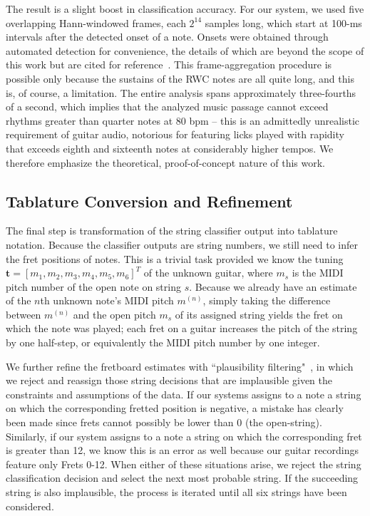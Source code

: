 \documentclass[12pt]{cmuthesis}
\begin{document}
The result is a slight boost in classification accuracy. For our system, we used five overlapping Hann-windowed frames, each $2^{14}$ samples long, which start at 100-ms intervals after the detected onset of a note. Onsets were obtained through automated detection for convenience, the details of which are beyond the scope of this work but are cited for reference~\cite{bello2005,dixon2006}. This frame-aggregation procedure is possible only because the sustains of the RWC notes are all quite long, and this is, of course, a limitation. The entire analysis spans approximately three-fourths of a second, which implies that the analyzed music passage cannot exceed rhythms greater than quarter notes at 80 bpm -- this is an admittedly unrealistic requirement of guitar audio, notorious for featuring licks played with rapidity that exceeds eighth and sixteenth notes at considerably higher tempos. We therefore emphasize the theoretical, proof-of-concept nature of this work.

\subsection{Tablature Conversion and Refinement}
The final step is transformation of the string classifier output into tablature notation. Because the classifier outputs are string numbers, we still need to infer the fret positions of notes. This is a trivial task provided we know the tuning $\mathbf{t} = [m_1, m_2, m_3, m_4, m_5, m_6]^T$ of the unknown guitar, where $m_s$ is the MIDI pitch number of the open note on string $s$. Because we already have an estimate of the $n$th unknown note's MIDI pitch $m^{(n)}$, simply taking the difference between $m^{(n)}$ and the open pitch $m_s$ of its assigned string yields the fret on which the note was played; each fret on a guitar increases the pitch of the string by one half-step, or equivalently the MIDI pitch number by one integer.

We further refine the fretboard estimates with ``plausibility filtering"~\cite{abesser2012}, in which we reject and reassign those string decisions that are implausible given the constraints and assumptions of the data. If our systems assigns to a note a string on which the corresponding fretted position is negative, a mistake has clearly been made since frets cannot possibly be lower than 0 (the open-string). Similarly, if our system assigns to a note a string on which the corresponding fret is greater than 12, we know this is an error as well because our guitar recordings feature only Frets 0-12. When either of these situations arise, we reject the string classification decision and select the next most probable string. If the succeeding string is also implausible, the process is iterated until all six strings have been considered.
\end{document}
